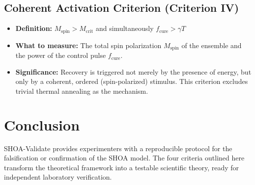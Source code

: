 \documentclass[12pt]{article}
\begin{document}
\subsection{Coherent Activation Criterion (Criterion IV)}
\begin{itemize}
    \item \textbf{Definition:} $M_{\text{spin}} > M_{\text{crit}}$ and simultaneously $f_{\text{cure}} > \gamma T$
    \item \textbf{What to measure:} The total spin polarization $M_{\text{spin}}$ of the ensemble and the power of the control pulse $f_{\text{cure}}$.
    \item \textbf{Significance:} Recovery is triggered not merely by the presence of energy, but only by a coherent, ordered (spin-polarized) stimulus. This criterion excludes trivial thermal annealing as the mechanism.
\end{itemize}

\section{Conclusion}
SHOA-Validate provides experimenters with a reproducible protocol for the falsification or confirmation of the SHOA model. The four criteria outlined here transform the theoretical framework into a testable scientific theory, ready for independent laboratory verification.
\end{document}
